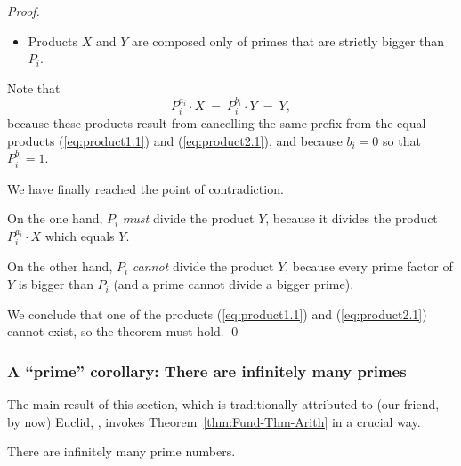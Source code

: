 \begin{proof}
\begin{itemize}
\item
Products $X$ and $Y$ are composed only of primes that are strictly
bigger than $P_i$.
\end{itemize}
Note that 
\[ P_i^{a_i} \cdot X \ = \ P_i^{b_i} \cdot Y \ = \ Y, \]
because these products result from cancelling the same prefix from the
equal products (\ref{eq:product1.1}) and (\ref{eq:product2.1}), and
because $b_i =0$ so that $P_i^{b_i} = 1$.

We have finally reached the point of contradiction.

On the one hand, $P_i$ {\em must} divide the product $Y$, because it
divides the product $P_i^{a_i} \cdot X$ which equals $Y$.

On the other hand, $P_i$ {\em cannot} divide the product $Y$, because
every prime factor of $Y$ is bigger than $P_i$ (and a prime cannot
divide a bigger prime).

We conclude that one of the products (\ref{eq:product1.1}) and
(\ref{eq:product2.1}) cannot exist, so the theorem must hold.  \qed
\end{proof}


\subsubsection{A ``prime'' corollary: There are infinitely many primes}
\label{sec:infinite-primes}

The main result of this section, which is traditionally attributed to
(our friend, by now) Euclid, , invokes
Theorem~\ref{thm:Fund-Thm-Arith} in a crucial way.

\begin{prop}
\label{thm:infinite-primes}
There are infinitely many prime numbers.
\end{prop}

